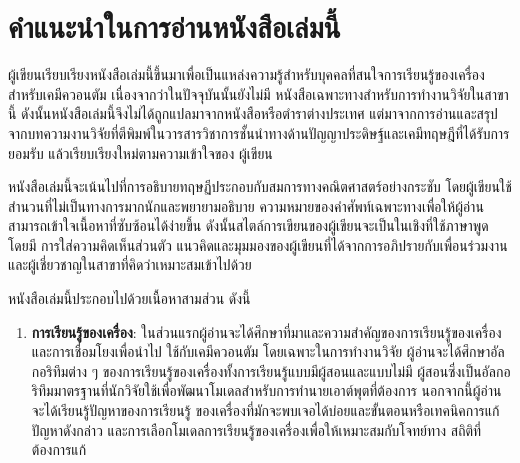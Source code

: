 

{

\chapter*{\centering คำแนะนำในการอ่านหนังสือเล่มนี้}

ผู้เขียนเรียบเรียงหนังสือเล่มนี้ขึ้นมาเพื่อเป็นแหล่งความรู้สำหรับบุคคลที่สนใจการเรียนรู้ของเครื่องสำหรับเคมีควอนตัม เนื่องจากว่าในปัจจุบันนั้นยังไม่มี%
หนังสือเฉพาะทางสำหรับการทำงานวิจัยในสาขานี้ ดังนั้นหนังสือเล่มนี้จึงไม่ได้ถูกแปลมาจากหนังสือหรือตำราต่างประเทศ แต่มาจากการอ่านและสรุป%
จากบทความงานวิจัยที่ตีพิมพ์ในวารสารวิชาการชั้นนำทางด้านปัญญาประดิษฐ์และเคมีทฤษฎีที่ได้รับการยอมรับ แล้วเรียบเรียงใหม่ตามความเข้าใจของ%
ผู้เขียน

หนังสือเล่มนี้จะเน้นไปที่การอธิบายทฤษฏีประกอบกับสมการทางคณิตศาสตร์อย่างกระชับ โดยผู้เขียนใช้สำนวนที่ไม่เป็นทางการมากนักและพยายามอธิบาย%
ความหมายของคำศัพท์เฉพาะทางเพื่อให้ผู้อ่านสามารถเข้าใจเนื้อหาที่ซับซ้อนได้ง่ายขึ้น ดังนั้นสไตล์การเขียนของผู้เขียนจะเป็นในเชิงที่ใช้ภาษาพูด โดยมี%
การใส่ความคิดเห็นส่วนตัว แนวคิดและมุมมองของผู้เขียนที่ได้จากการอภิปรายกับเพื่อนร่วมงานและผู้เชี่ยวชาญในสาขาที่คิดว่าเหมาะสมเข้าไปด้วย

หนังสือเล่มนี้ประกอบไปด้วยเนื้อหาสามส่วน ดังนี้ 

\begin{enumerate}[topsep=0pt]
    \item \textbf{การเรียนรู้ของเครื่อง}: ในส่วนแรกผู้อ่านจะได้ศึกษาที่มาและความสำคัญของการเรียนรู้ของเครื่องและการเชื่อมโยงเพื่อนำไป%
    ใช้กับเคมีควอนตัม โดยเฉพาะในการทำงานวิจัย ผู้อ่านจะได้ศึกษาอัลกอริทึมต่าง ๆ ของการเรียนรู้ของเครื่องทั้งการเรียนรู้แบบมีผู้สอนและแบบไม่มี%
    ผู้สอนซึ่งเป็นอัลกอริทึมมาตรฐานที่นักวิจัยใช้เพื่อพัฒนาโมเดลสำหรับการทำนายเอาต์พุตที่ต้องการ นอกจากนี้ผู้อ่านจะได้เรียนรู้ปัญหาของการเรียนรู้%
    ของเครื่องที่มักจะพบเจอได้บ่อยและขั้นตอนหรือเทคนิคการแก้ปัญหาดังกล่าว และการเลือกโมเดลการเรียนรู้ของเครื่องเพื่อให้เหมาะสมกับโจทย์ทาง%
    สถิติที่ต้องการแก้
    

\end{enumerate}}
